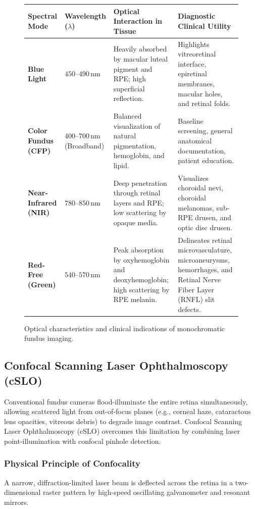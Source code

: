 \documentclass[11pt,a4paper]{article}
\begin{document}
\begin{figure}[htbp]
\centering
\setlength{\tabcolsep}{4pt}
\begin{tabular}{p{3.2cm}p{2.5cm}p{4.5cm}p{4.5cm}}
\toprule
\textbf{Spectral Mode} & \textbf{Wavelength ($\lambda$)} & \textbf{Optical Interaction in Tissue} & \textbf{Diagnostic Clinical Utility} \\
\midrule
\textbf{Blue Light} & $450\text{--}490\,\text{nm}$ & Heavily absorbed by macular luteal pigment and RPE; high superficial reflection. & Highlights vitreoretinal interface, epiretinal membranes, macular holes, and retinal folds. \\
\addlinespace
\textbf{Color Fundus (CFP)} & $400\text{--}700\,\text{nm}$ (Broadband) & Balanced visualization of natural pigmentation, hemoglobin, and lipid. & Baseline screening, general anatomical documentation, patient education. \\
\addlinespace
\textbf{Near-Infrared (NIR)} & $780\text{--}850\,\text{nm}$ & Deep penetration through retinal layers and RPE; low scattering by opaque media. & Visualizes choroidal nevi, choroidal melanomas, sub-RPE drusen, and optic disc drusen. \\
\addlinespace
\textbf{Red-Free (Green)} & $540\text{--}570\,\text{nm}$ & Peak absorption by oxyhemoglobin and deoxyhemoglobin; high scattering by RPE melanin. & Delineates retinal microvasculature, microaneurysms, hemorrhages, and Retinal Nerve Fiber Layer (RNFL) slit defects. \\
\bottomrule
\end{tabular}
\caption{Optical characteristics and clinical indications of monochromatic fundus imaging.}
\label{tab:spectral_imaging}
\end{figure}

\subsection{Confocal Scanning Laser Ophthalmoscopy (cSLO)}

Conventional fundus cameras flood-illuminate the entire retina simultaneously, allowing scattered light from out-of-focus planes (e.g., corneal haze, cataractous lens opacities, vitreous debris) to degrade image contrast. Confocal Scanning Laser Ophthalmoscopy (cSLO) overcomes this limitation by combining laser point-illumination with confocal pinhole detection.

\subsubsection{Physical Principle of Confocality}
A narrow, diffraction-limited laser beam is deflected across the retina in a two-dimensional raster pattern by high-speed oscillating galvanometer and resonant mirrors. 
\end{document}
